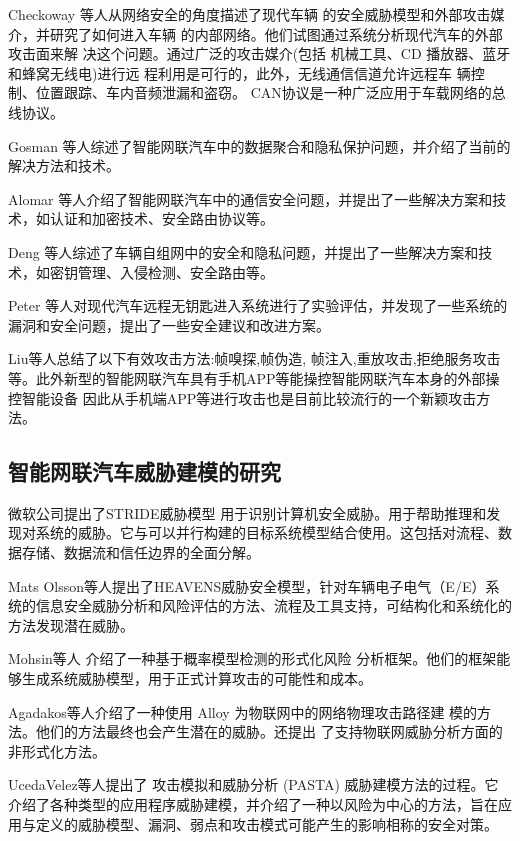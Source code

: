 Checkoway\cite{checkoway2011comprehensive} 等人从网络安全的角度描述了现代车辆
的安全威胁模型和外部攻击媒介，并研究了如何进入车辆
的内部网络。他们试图通过系统分析现代汽车的外部攻击面来解
决这个问题。通过广泛的攻击媒介(包括
机械工具、CD 播放器、蓝牙和蜂窝无线电)进行远
程利用是可行的，此外，无线通信信道允许远程车
辆控制、位置跟踪、车内音频泄漏和盗窃。
CAN协议是一种广泛应用于车载网络的总线协议。

Gosman\cite{7987438} 等人综述了智能网联汽车中的数据聚合和隐私保护问题，并介绍了当前的解决方法和技术。

Alomar\cite{alomar2017secure} 等人介绍了智能网联汽车中的通信安全问题，并提出了一些解决方案和技术，如认证和加密技术、安全路由协议等。

Deng \cite{deng2014security} 等人综述了车辆自组网中的安全和隐私问题，并提出了一些解决方案和技术，如密钥管理、入侵检测、安全路由等。

Peter \cite{peter2019evaluation} 等人对现代汽车远程无钥匙进入系统进行了实验评估，并发现了一些系统的漏洞和安全问题，提出了一些安全建议和改进方案。

Liu\cite{liu2017vehicle}等人总结了以下有效攻击方法:帧嗅探,帧伪造,
帧注入,重放攻击,拒绝服务攻击等。此外新型的智能网联汽车具有手机APP等能操控智能网联汽车本身的外部操控智能设备
因此从手机端APP等进行攻击也是目前比较流行的一个新颖攻击方法。

\subsection{智能网联汽车威胁建模的研究}
微软公司提出了STRIDE威胁模型 \cite{kohnfelder1999threats} 用于识别计算机安全威胁。用于帮助推理和发现对系统的威胁。它与可以并行构建的目标系统模型结合使用。这包括对流程、数据存储、数据流和信任边界的全面分解。

Mats Olsson\cite{lautenbach2021proposing}等人提出了HEAVENS威胁安全模型，针对车辆电子电气（E/E）系统的信息安全威胁分析和风险评估的方法、流程及工具支持，可结构化和系统化的方法发现潜在威胁。

Mohsin等人\cite{mohsin2017iotriskanalyzer} 介绍了一种基于概率模型检测的形式化风险
分析框架。他们的框架能够生成系统威胁模型，用于正式计算攻击的可能性和成本。

Agadakos\cite{agadakos2017jumping}等人介绍了一种使用 Alloy 为物联网中的网络物理攻击路径建
模的方法。他们的方法最终也会产生潜在的威胁。还提出
了支持物联网威胁分析方面的非形式化方法。

UcedaVelez等人提出了\cite{ucedavelez2015risk} 攻击模拟和威胁分析 (PASTA) 威胁建模方法的过程。它介绍了各种类型的应用程序威胁建模，并介绍了一种以风险为中心的方法，旨在应用与定义的威胁模型、漏洞、弱点和攻击模式可能产生的影响相称的安全对策。 

